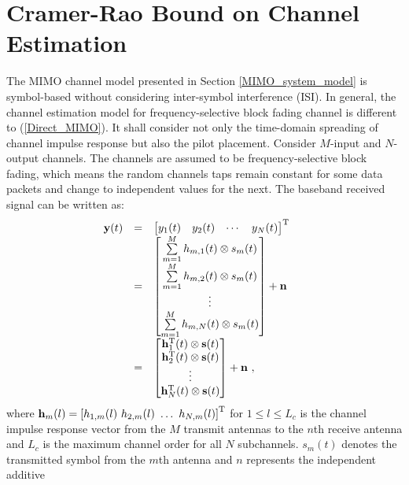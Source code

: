 \documentclass[10pt,fleqn, twocolumn]{IEEEtran}
\newcommand{\bh}{{\bf h}}
\newcommand{\bH}{{\bf H}}
\newcommand{\bs}{{\bf s}}
\newcommand{\bn}{{\bf n}}
\newcommand{\by}{{\bf y}}
\begin{document}
\section{Cramer-Rao Bound on Channel Estimation}
The MIMO channel model presented in Section
\ref{MIMO_system_model} is symbol-based without considering
inter-symbol interference (ISI). In general, the channel
estimation model for frequency-selective block fading channel is
different to (\ref{Direct_MIMO}). It shall consider not only the
time-domain spreading of channel impulse response but also the
pilot placement. Consider $M$-input and $N$-output channels. The
channels are assumed to be frequency-selective block fading, which
means the random channels taps remain constant for some data
packets and change to independent values for the next. The
baseband received signal can be written as:
\begin{equation}\hspace{-0.20in}
\begin{array}{rcl}
\by(t)&=&\left[\begin{matrix}y_{1}(t)&y_{2}(t)&\cdots&y_{N}(t)\end{matrix}\right]^{\rm T}\\
&=&\left[\begin{matrix}\sum\limits_{m=1}^{M}h_{m,1}(t)\otimes s_m(t)\\ \sum\limits_{m=1}^{M}h_{m,2}(t)\otimes s_m(t)\\ \vdots \\
\sum\limits_{m=1}^{M}h_{m,N}(t)\otimes
s_m(t)\end{matrix}\right]+\bn\\
&=&\left[\begin{matrix}\bh_{1}^{\rm T}(t)\otimes \bs(t)\\ \bh_{2}^{\rm T}(t)\otimes \bs(t)\\ \vdots \\
\bh_{N}^{\rm T}(t)\otimes \bs(t)\end{matrix}\right]+\bn\ ,
\end{array}
\end{equation}
\noindent where $\bh_{m}(l)=\left[h_{1,m}(l)\ h_{2,m}(l)\ \ldots\
h_{N,m}(l)\right]^{\rm T}$ for $1\leq l \leq L_{c}$ is the channel
impulse response vector from the $M$ transmit antennas to the
$n$th receive antenna and $L_{c}$ is the maximum channel order for
all $N$ subchannels. $s_m(t)$ denotes the transmitted symbol from
the $m$th antenna and $n$ represents the independent additive
\end{document}
